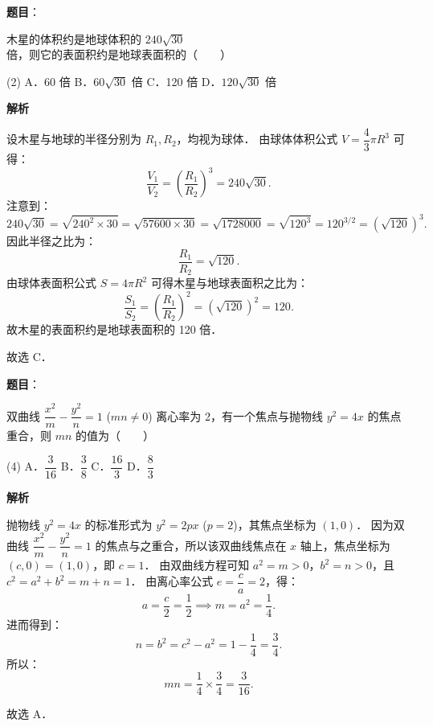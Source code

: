 \begin{answer}

\textbf{题目}：

木星的体积约是地球体积的 $240\sqrt{30}$ 倍，则它的表面积约是地球表面积的\mbox{（　　）}

\begin{gkopts}(2)
\task A．60 倍
\task B．$60\sqrt{30}$ 倍
\task C．120 倍
\task D．$120\sqrt{30}$ 倍
\end{gkopts}

\textbf{解析}

设木星与地球的半径分别为 $R_1, R_2$，均视为球体．
由球体体积公式 $V = \dfrac{4}{3}\pi R^3$ 可得：
\nopagebreak[4]
\[
\frac{V_1}{V_2} = \left(\frac{R_1}{R_2}\right)^3 = 240\sqrt{30}.
\]
注意到：
\nopagebreak[4]
\[
240\sqrt{30} = \sqrt{240^2 \times 30} = \sqrt{57600 \times 30} = \sqrt{1728000} = \sqrt{120^3} = 120^{3/2} = (\sqrt{120})^3.
\]
因此半径之比为：
\nopagebreak[4]
\[
\frac{R_1}{R_2} = \sqrt{120}.
\]
由球体表面积公式 $S = 4\pi R^2$ 可得木星与地球表面积之比为：
\nopagebreak[4]
\[
\frac{S_1}{S_2} = \left(\frac{R_1}{R_2}\right)^2 = (\sqrt{120})^2 = 120.
\]
故木星的表面积约是地球表面积的 120 倍．

故选 C．


\end{answer}
\begin{answer}

\textbf{题目}：

双曲线 $\dfrac{x^2}{m} - \dfrac{y^2}{n} = 1$ ($mn \neq 0$) 离心率为 2，有一个焦点与抛物线 $y^2 = 4x$ 的焦点重合，则 $mn$ 的值为\mbox{（　　）}

\begin{gkopts}(4)
\task A．$\dfrac{3}{16}$
\task B．$\dfrac{3}{8}$
\task C．$\dfrac{16}{3}$
\task D．$\dfrac{8}{3}$
\end{gkopts}

\textbf{解析}

抛物线 $y^2 = 4x$ 的标准形式为 $y^2 = 2px$ ($p = 2$)，其焦点坐标为 $(1, 0)$．
因为双曲线 $\dfrac{x^2}{m} - \dfrac{y^2}{n} = 1$ 的焦点与之重合，所以该双曲线焦点在 $x$ 轴上，焦点坐标为 $(c, 0) = (1, 0)$，即 $c = 1$．
由双曲线方程可知 $a^2 = m > 0$，$b^2 = n > 0$，且 $c^2 = a^2 + b^2 = m + n = 1$．
由离心率公式 $e = \dfrac{c}{a} = 2$，得：
\nopagebreak[4]
\[
a = \frac{c}{2} = \frac{1}{2} \implies m = a^2 = \frac{1}{4}.
\]
进而得到：
\nopagebreak[4]
\[
n = b^2 = c^2 - a^2 = 1 - \frac{1}{4} = \frac{3}{4}.
\]
所以：
\nopagebreak[4]
\[
mn = \frac{1}{4} \times \frac{3}{4} = \frac{3}{16}.
\]

故选 A．


\end{answer}
